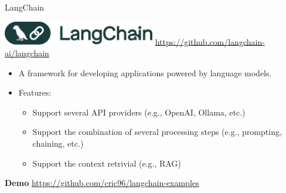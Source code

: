 \documentclass[presentation, 10pt]{beamer}\mode<presentation>{\usetheme{AMSBolognaFC}}
\begin{document}
\begin{frame}{LangChain}
\begin{center}
\includegraphics[width=0.5\textwidth]{img/logo.png}
\url{https://github.com/langchain-ai/langchain}
\end{center}
\begin{itemize}
	\item A framework for developing applications powered by language models.
	\item Features:	
	\begin{itemize}
		\item Support several API providers (e.g., OpenAI, Ollama, etc.)
		\item Support the combination of several processing steps (e.g., prompting, chaining, etc.)
		\item Support the context retrivial (e.g., RAG)
	\end{itemize}
\end{itemize}
\begin{center}
\huge{\textbf{Demo}}
\url{https://github.com/cric96/langchain-examples}
\end{center}
\end{frame}
\end{document}
